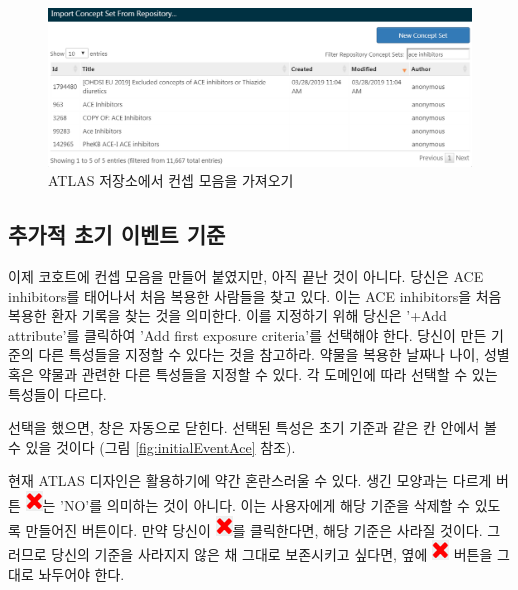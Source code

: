 \documentclass[11pt]{book}
\theoremstyle{definition}
\theoremstyle{definition}
\theoremstyle{definition}
\theoremstyle{remark}
\let\BeginKnitrBlock\begin \let\EndKnitrBlock\end
\begin{document}
\begin{figure}

{\centering \includegraphics[width=1\linewidth]{images/Cohorts/ATLAS-findingyourconcept} 

}

\caption{ATLAS 저장소에서 컨셉 모음을 가져오기}\label{fig:ATLASfindyourconcept}
\end{figure}

\subsection{추가적 초기 이벤트 기준}\label{---}

이제 코호트에 컨셉 모음을 만들어 붙였지만, 아직 끝난 것이 아니다. 당신은
ACE inhibitors를 태어나서 처음 복용한 사람들을 찾고 있다. 이는 ACE
inhibitors을 처음 복용한 환자 기록을 찾는 것을 의미한다. 이를 지정하기
위해 당신은 '+Add attribute'를 클릭하여 'Add first exposure criteria'를
선택해야 한다. 당신이 만든 기준의 다른 특성들을 지정할 수 있다는 것을
참고하라. 약물을 복용한 날짜나 나이, 성별 혹은 약물과 관련한 다른
특성들을 지정할 수 있다. 각 도메인에 따라 선택할 수 있는 특성들이
다르다.

선택을 했으면, 창은 자동으로 닫힌다. 선택된 특성은 초기 기준과 같은 칸
안에서 볼 수 있을 것이다 (그림 \ref{fig:initialEventAce} 참조).

\BeginKnitrBlock{rmdimportant}
현재 ATLAS 디자인은 활용하기에 약간 혼란스러울 수 있다. 생긴 모양과는
다르게 버튼 \includegraphics{images/Cohorts/redX.png}는 'NO'를 의미하는
것이 아니다. 이는 사용자에게 해당 기준을 삭제할 수 있도록 만들어진
버튼이다. 만약 당신이 \includegraphics{images/Cohorts/redX.png}를
클릭한다면, 해당 기준은 사라질 것이다. 그러므로 당신의 기준을 사라지지
않은 채 그대로 보존시키고 싶다면, 옆에
\includegraphics{images/Cohorts/redX.png} 버튼을 그대로 놔두어야 한다.
\EndKnitrBlock{rmdimportant}
\end{document}
